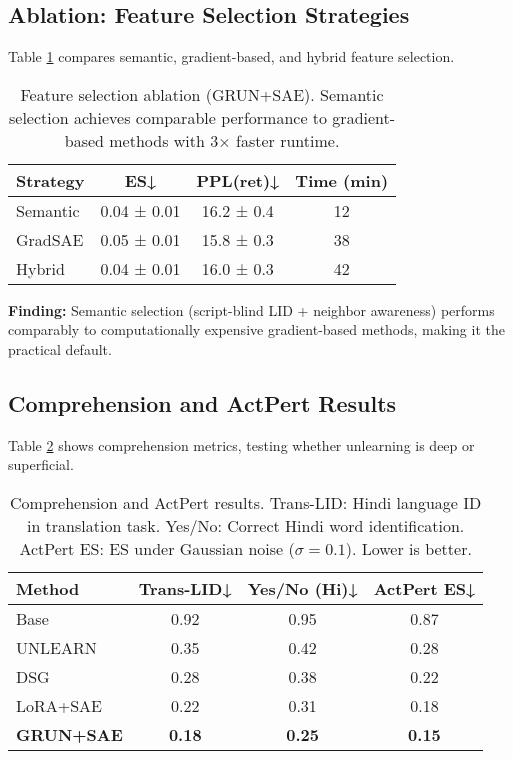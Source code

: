 \documentclass[11pt]{article}
\begin{document}
\subsection{Ablation: Feature Selection Strategies}

Table \ref{tab:feature_ablation} compares semantic, gradient-based, and hybrid feature selection.

\begin{table}[h]
\centering
\small
\begin{tabular}{@{}lccc@{}}
\toprule
\textbf{Strategy} & \textbf{ES↓} & \textbf{PPL(ret)↓} & \textbf{Time (min)} \\
\midrule
Semantic & 0.04 ± 0.01 & 16.2 ± 0.4 & 12 \\
GradSAE & 0.05 ± 0.01 & 15.8 ± 0.3 & 38 \\
Hybrid & 0.04 ± 0.01 & 16.0 ± 0.3 & 42 \\
\bottomrule
\end{tabular}
\caption{Feature selection ablation (GRUN+SAE). Semantic selection achieves comparable performance to gradient-based methods with 3× faster runtime.}
\label{tab:feature_ablation}
\end{table}

\textbf{Finding:} Semantic selection (script-blind LID + neighbor awareness) performs comparably to computationally expensive gradient-based methods, making it the practical default.

\subsection{Comprehension and ActPert Results}

Table \ref{tab:comprehension} shows comprehension metrics, testing whether unlearning is deep or superficial.

\begin{table}[h]
\centering
\small
\begin{tabular}{@{}lccc@{}}
\toprule
\textbf{Method} & \textbf{Trans-LID↓} & \textbf{Yes/No (Hi)↓} & \textbf{ActPert ES↓} \\
\midrule
Base & 0.92 & 0.95 & 0.87 \\
UNLEARN & 0.35 & 0.42 & 0.28 \\
DSG & 0.28 & 0.38 & 0.22 \\
LoRA+SAE & 0.22 & 0.31 & 0.18 \\
\textbf{GRUN+SAE} & \textbf{0.18} & \textbf{0.25} & \textbf{0.15} \\
\bottomrule
\end{tabular}
\caption{Comprehension and ActPert results. Trans-LID: Hindi language ID in translation task. Yes/No: Correct Hindi word identification. ActPert ES: ES under Gaussian noise ($\sigma=0.1$). Lower is better.}
\label{tab:comprehension}
\end{table}
\end{document}
